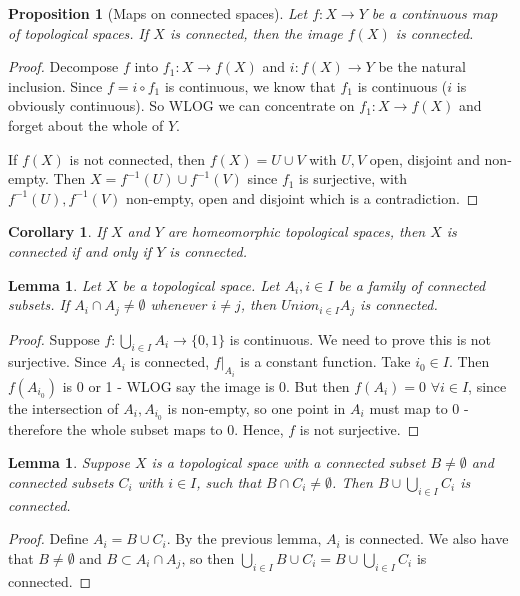 \documentclass{article}
\theoremstyle{definition}
\theoremstyle{plain}%
\newtheorem{lem}[thm]{Lemma}
\newtheorem{prop}[thm]{Proposition}
\newtheorem*{cor}{Corollary}
\theoremstyle{remark}
\newcommand{\union}{\cup}
\newcommand{\Union}{\bigcup}
\newcommand{\intersection}{\cap}
\begin{document}
\begin{prop}[Maps on connected spaces]\label{Maps on connected spaces}
    Let $f:X \to Y$ be a continuous map of topological spaces. If $X$ is connected, then the image $f(X)$ is connected.
\end{prop}

\begin{proof}
    Decompose $f$ into $f_1: X \to f(X)$ and $i : f(X) \to Y$ be the natural inclusion. Since $f = i \circ f_1$ is continuous, we know that $f_1$ is continuous ($i$ is obviously continuous). So WLOG we can concentrate on $f_1 : X \to f(X)$ and forget about the whole of $Y$.
    
    If $f(X)$ is not connected, then $f(X) = U \union V$ with $U,V$ open, disjoint and non-empty. Then $X = f^{-1}(U) \union f^{-1}(V)$ since $f_1$ is surjective, with $f^{-1}(U), f^{-1}(V)$ non-empty, open and disjoint which is a contradiction.
\end{proof}

\begin{cor}
    If $X$ and $Y$ are homeomorphic topological spaces, then $X$ is connected if and only if $Y$ is connected.
\end{cor}

\begin{lem}
    Let $X$ be a topological space. Let $A_i, i \in I$ be a family of connected subsets. If $A_i \intersection A_j \ne \emptyset$ whenever $i \ne j$, then $Union_{i \in I} A_j$ is connected.
\end{lem}

\begin{proof}
    Suppose $f : \Union_{i \in I} A_i \to \{0,1\}$ is continuous. We need to prove this is not surjective. Since $A_i$ is connected, $f|_{A_i}$ is a constant function. Take $i_0 \in I$. Then $f(A_{i_0})$ is 0 or 1 - WLOG say the image is 0. But then $f(A_i) = 0$ $\forall i \in I$, since the intersection of $A_i, A_{i_0}$ is non-empty, so one point in $A_i$ must map to 0 - therefore the whole subset maps to 0. Hence, $f$ is not surjective.
\end{proof}

\begin{lem}
    Suppose $X$ is a topological space with a connected subset $B \ne \emptyset$ and connected subsets $C_i$ with $i \in I$, such that $B \intersection C_i \ne \emptyset$. Then $B \union \Union_{i \in I} C_i$ is connected.
\end{lem}

\begin{proof}
    Define $A_i = B \union C_i$. By the previous lemma, $A_i$ is connected. We also have that $B \ne \emptyset$ and $B \subset A_i \intersection A_j$, so then $\Union_{i \in I} B \union C_i = B \union \Union_{i \in I} C_i$ is connected.
\end{proof}
\end{document}
